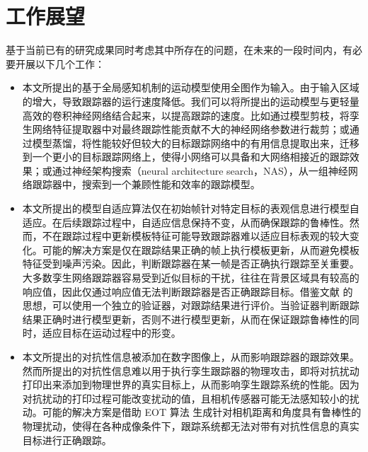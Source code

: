 \section{工作展望}
基于当前已有的研究成果同时考虑其中所存在的问题，在未来的一段时间内，有必要开展以下几个工作：
\begin{itemize}
\item 本文所提出的基于全局感知机制的运动模型使用全图作为输入。由于输入区域的增大，导致跟踪器的运行速度降低。我们可以将所提出的运动模型与更轻量高效的卷积神经网络结合起来，以提高跟踪的速度。比如通过模型剪枝，将孪生网络特征提取器中对最终跟踪性能贡献不大的神经网络参数进行裁剪；或通过模型蒸馏，将性能较好但较大的目标跟踪网络中的有用信息提取出来，迁移到一个更小的目标跟踪网络上，使得小网络可以具备和大网络相接近的跟踪效果；或通过神经架构搜索（neural architecture search，NAS），从一组神经网络跟踪器中，搜索到一个兼顾性能和效率的跟踪模型。
\item 本文所提出的模型自适应算法仅在初始帧针对特定目标的表观信息进行模型自适应。在后续跟踪过程中，自适应信息保持不变，从而确保跟踪的鲁棒性。然而，不在跟踪过程中更新模板特征可能导致跟踪器难以适应目标表观的较大变化。可能的解决方案是仅在跟踪结果正确的帧上执行模板更新，从而避免模板特征受到噪声污染。因此，判断跟踪器在某一帧是否正确执行跟踪至关重要。大多数孪生网络跟踪器容易受到近似目标的干扰，往往在背景区域具有较高的响应值，因此仅通过响应值无法判断跟踪器是否正确跟踪目标。借鉴文献 \cite{fan2018parallel} 的思想，可以使用一个独立的验证器，对跟踪结果进行评价。当验证器判断跟踪结果正确时进行模型更新，否则不进行模型更新，从而在保证跟踪鲁棒性的同时，适应目标在运动过程中的形变。
\item 本文所提出的对抗性信息被添加在数字图像上，从而影响跟踪器的跟踪效果。然而所提出的对抗性信息难以用于执行孪生跟踪器的物理攻击，即将对抗扰动打印出来添加到物理世界的真实目标上，从而影响孪生跟踪系统的性能。因为对抗扰动的打印过程可能改变扰动的值，且相机传感器可能无法感知较小的扰动。可能的解决方案是借助 EOT 算法 \cite{athalye2018synthesizing} 生成针对相机距离和角度具有鲁棒性的物理扰动，使得在各种成像条件下，跟踪系统都无法对带有对抗性信息的真实目标进行正确跟踪。
\end{itemize}